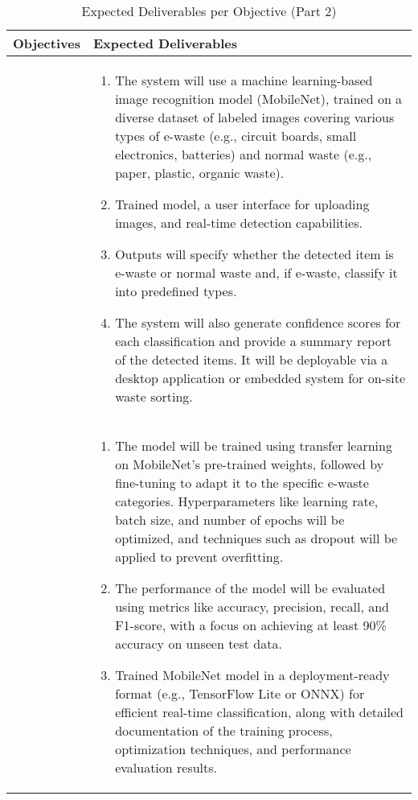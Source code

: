\begin{table}[!htbp]
    \footnotesize
    \caption{Expected Deliverables per Objective (Part 2)}
    \label{tab:expected_deliverables_2}
    \centering
    \begin{tabular}{p{}|p{}}
        \hline 
        \hline 
        \textbf{Objectives} & \textbf{Expected Deliverables} \\ 
        \hline 

		\Paste{SO2} & 
		\begin{enumerate}
		\item The system will use a machine learning-based image recognition model (MobileNet), trained on a diverse dataset of labeled images covering various types of e-waste (e.g., circuit boards, small electronics, batteries) and normal waste (e.g., paper, plastic, organic waste). 
		\item Trained model, a user interface for uploading images, and real-time detection capabilities. 
		\item Outputs will specify whether the detected item is e-waste or normal waste and, if e-waste, classify it into predefined types. 
		\item The system will also generate confidence scores for each classification and provide a summary report of the detected items. It will be deployable via a desktop application or embedded system for on-site waste sorting.
		\end{enumerate} \\ \hline
		
		\Paste{SO3} & 
		\begin{enumerate}
		\item The model will be trained using transfer learning on MobileNet's pre-trained weights, followed by fine-tuning to adapt it to the specific e-waste categories. Hyperparameters like learning rate, batch size, and number of epochs will be optimized, and techniques such as dropout will be applied to prevent overfitting. 
		\item The performance of the model will be evaluated using metrics like accuracy, precision, recall, and F1-score, with a focus on achieving at least 90\% accuracy on unseen test data. 
		\item Trained MobileNet model in a deployment-ready format (e.g., TensorFlow Lite or ONNX) for efficient real-time classification, along with detailed documentation of the training process, optimization techniques, and performance evaluation results.
		\end{enumerate} \\ \hline
					

\end{tabular}
\end{table}
